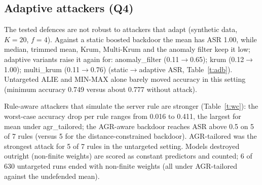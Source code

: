 \documentclass[conference]{IEEEtran}
\begin{document}
\subsection{Adaptive attackers (Q4)}\label{sec:adapt}
The tested defences are not robust to attackers that adapt (synthetic data, $K=20$, $f=4$). Against a static boosted backdoor the mean has ASR 1.00, while median, trimmed mean, Krum, Multi-Krum and the anomaly filter keep it low; adaptive variants raise it again for: anomaly\_filter (0.11$\to$0.65); krum (0.12$\to$1.00); multi\_krum (0.11$\to$0.76) (static$\to$adaptive ASR, Table~\ref{t:adb}). Untargeted ALIE and MIN-MAX alone barely moved accuracy in this setting (minimum accuracy 0.749 versus about 0.777 without attack).
\begin{table}[t]\centering\caption{Backdoor ASR, static vs adaptive attacks (synthetic).}\label{t:adb}\scriptsize
{}\end{table}
Rule-aware attackers that simulate the server rule are stronger (Table~\ref{t:wc}): the worst-case accuracy drop per rule ranges from 0.016 to 0.411, the largest for mean under agr\_tailored; the AGR-aware backdoor reaches ASR above 0.5 on 5 of 7 rules (versus 5 for the distance-constrained backdoor). AGR-tailored was the strongest attack for 5 of 7 rules in the untargeted setting. Models destroyed outright (non-finite weights) are scored as constant predictors and counted; 6 of 630 untargeted runs ended with non-finite weights (all under AGR-tailored against the undefended mean).
\end{document}
